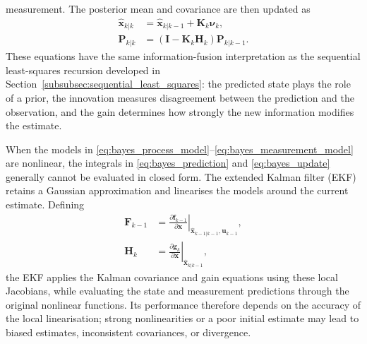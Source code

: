 \documentclass[graybox,envcountchap]{style/SNmono}
\begin{document}
measurement. The posterior mean and covariance are then updated as
\begin{align}
\widehat{\mathbf{x}}_{k|k} &= \widehat{\mathbf{x}}_{k|k-1} + \mathbf{K}_k\boldsymbol{\nu}_k, \label{eq:kf_state_update}\\
\mathbf{P}_{k|k} &= (\mathbf{I}-\mathbf{K}_k\mathbf{H}_k) \mathbf{P}_{k|k-1}. \label{eq:kf_cov_update}
\end{align} 
These equations have the same information-fusion interpretation as the sequential least-squares recursion developed in Section~\ref{subsubsec:sequential_least_squares}: the predicted state plays the role of a prior, the innovation measures disagreement between the prediction and the observation, and the gain determines how strongly the new information modifies the estimate.

When the models in \eqref{eq:bayes_process_model}--\eqref{eq:bayes_measurement_model} are nonlinear, the integrals in \eqref{eq:bayes_prediction} and
\eqref{eq:bayes_update} generally cannot be evaluated in closed form.
The extended Kalman filter (EKF) retains a Gaussian approximation and
linearises the models around the current estimate. Defining
\begin{subequations}
\begin{align}
\mathbf{F}_{k-1}
&=
\left.
\frac{\partial\mathbf{f}_{k-1}}{\partial\mathbf{x}}
\right|_{\widehat{\mathbf{x}}_{k-1|k-1},
\mathbf{u}_{k-1}},
\\
\mathbf{H}_k
&=
\left.
\frac{\partial\mathbf{g}_k}{\partial\mathbf{x}}
\right|_{\widehat{\mathbf{x}}_{k|k-1}},
\end{align}
\end{subequations}
the EKF applies the Kalman covariance and gain equations using these
local Jacobians, while evaluating the state and measurement predictions
through the original nonlinear functions. Its performance therefore
depends on the accuracy of the local linearisation; strong
nonlinearities or a poor initial estimate may lead to biased estimates,
inconsistent covariances, or divergence.
\end{document}
